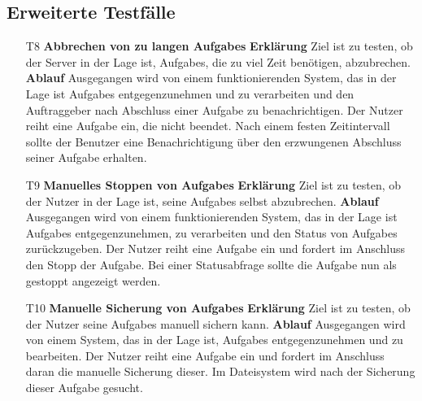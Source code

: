 \documentclass[a4paper,12pt]{article}
\begin{document}
\newpage

\subsection{Erweiterte Testfälle}

\begin{itemize}

\item[T8] \textbf{Abbrechen von zu langen \glspl{Aufgabe} }
\subitem \textbf{Erklärung} Ziel ist zu testen, ob der \gls{Server} in der Lage ist, \glspl{Aufgabe}, die zu viel Zeit benötigen, abzubrechen.
\subitem \textbf{Ablauf} Ausgegangen wird von einem funktionierenden System, das in der Lage ist \glspl{Aufgabe} entgegenzunehmen und zu verarbeiten und den Auftraggeber nach Abschluss einer \gls{Aufgabe} zu benachrichtigen.
Der Nutzer reiht eine \gls{Aufgabe} ein, die nicht beendet. Nach einem festen Zeitintervall sollte der \gls{Benutzer} eine Benachrichtigung über den erzwungenen Abschluss seiner \gls{Aufgabe} erhalten.

\item[T9] \textbf{Manuelles Stoppen von \glspl{Aufgabe} }
\subitem \textbf{Erklärung} Ziel ist zu testen, ob der Nutzer in der Lage ist, seine \glspl{Aufgabe} selbst abzubrechen.
\subitem \textbf{Ablauf} Ausgegangen wird von einem funktionierenden System, das in der Lage ist \glspl{Aufgabe} entgegenzunehmen, zu verarbeiten und den Status von \glspl{Aufgabe} zurückzugeben.
Der Nutzer reiht eine \gls{Aufgabe} ein und fordert im Anschluss den Stopp der \gls{Aufgabe}. Bei einer Statusabfrage sollte die \gls{Aufgabe} nun als gestoppt angezeigt werden.

\item[T10] \textbf{Manuelle Sicherung von \glspl{Aufgabe}}
\subitem \textbf{Erklärung} Ziel ist zu testen, ob der Nutzer seine \glspl{Aufgabe} manuell sichern kann.
\subitem \textbf{Ablauf} Ausgegangen wird von einem System, das in der Lage ist, \glspl{Aufgabe} entgegenzunehmen und zu bearbeiten.
Der Nutzer reiht eine \gls{Aufgabe} ein und fordert im Anschluss daran die manuelle Sicherung dieser. Im Dateisystem wird nach der Sicherung dieser \gls{Aufgabe} gesucht.

\end{itemize}

\clearpage
\printnoidxglossaries
\end{document}
